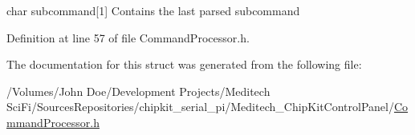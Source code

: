 char subcommand\mbox{[}1\mbox{]} Contains the last parsed subcommand 



Definition at line 57 of file Command\-Processor.\-h.



The documentation for this struct was generated from the following file\-:\begin{DoxyCompactItemize}
\item 
/\-Volumes/\-John Doe/\-Development Projects/\-Meditech Sci\-Fi/\-Sources\-Repositories/chipkit\-\_\-serial\-\_\-pi/\-Meditech\-\_\-\-Chip\-Kit\-Control\-Panel/\hyperlink{_command_processor_8h}{Command\-Processor.\-h}\end{DoxyCompactItemize}
